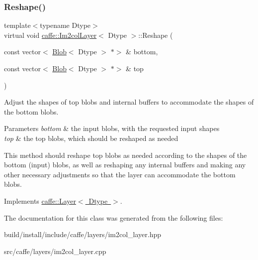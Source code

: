 \subsubsection{\texorpdfstring{Reshape()}{Reshape()}\hspace{0.1cm}{\footnotesize\ttfamily [2/2]}}
{\footnotesize\ttfamily template$<$typename Dtype$>$ \\
virtual void \mbox{\hyperlink{classcaffe_1_1_im2col_layer}{caffe\+::\+Im2col\+Layer}}$<$ Dtype $>$\+::Reshape (\begin{DoxyParamCaption}\item[{const vector$<$ \mbox{\hyperlink{classcaffe_1_1_blob}{Blob}}$<$ Dtype $>$ $\ast$$>$ \&}]{bottom,  }\item[{const vector$<$ \mbox{\hyperlink{classcaffe_1_1_blob}{Blob}}$<$ Dtype $>$ $\ast$$>$ \&}]{top }\end{DoxyParamCaption})\hspace{0.3cm}{\ttfamily [virtual]}}



Adjust the shapes of top blobs and internal buffers to accommodate the shapes of the bottom blobs. 


\begin{DoxyParams}{Parameters}
{\em bottom} & the input blobs, with the requested input shapes \\
\hline
{\em top} & the top blobs, which should be reshaped as needed\\
\hline
\end{DoxyParams}
This method should reshape top blobs as needed according to the shapes of the bottom (input) blobs, as well as reshaping any internal buffers and making any other necessary adjustments so that the layer can accommodate the bottom blobs. 

Implements \mbox{\hyperlink{classcaffe_1_1_layer_a7fe981e8af8d93d587acf2a952be563d}{caffe\+::\+Layer$<$ Dtype $>$}}.



The documentation for this class was generated from the following files\+:\begin{DoxyCompactItemize}
\item 
build/install/include/caffe/layers/im2col\+\_\+layer.\+hpp\item 
src/caffe/layers/im2col\+\_\+layer.\+cpp\end{DoxyCompactItemize}
